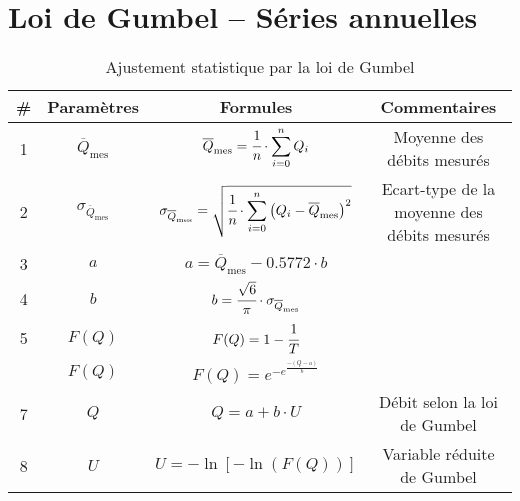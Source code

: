 \section{Loi de Gumbel -- Séries annuelles}
\begin{table}[H]
    \centering
    \begin{tabular}{c|c|c|c}
        \# & \textbf{Paramètres}                & \textbf{Formules}                                                                                                                         & \textbf{Commentaires}      \\
        \hline
        1  & $\overline{Q}_\text{mes}$          & $\overline{Q}_\text{mes} = \cfrac{1}{n} \cdot \displaystyle{\sum_{i=0}^{n} Q_i}$                                                          & Moyenne des débits mesurés \\
        \hline
        2  & $\sigma_{\overline{Q}_\text{mes}}$ & $\sigma_{\overline{Q}_\text{mes}} = \sqrt{\cfrac{1}{n} \cdot \displaystyle{\sum_{i=0}^{n} \left(Q_i - \overline{Q}_\text{mes}\right)^2}}$ & Ecart-type de la moyenne des débits mesurés \\
        \hline
        3  & $a$                                & $a = \overline{Q}_\text{mes} - 0.5772 \cdot b$                                                                                            & \\
        \hline
        4  & $b$                                & $b = \cfrac{\sqrt{6}}{\pi} \cdot \sigma_{\overline{Q}_\text{mes}}$                                                                        & \\
        \hline
        5  & $F(Q)$                             & $F(Q) = 1-\cfrac{1}{T}$                                                                                                                   & \\
        \hdashline                   
        6  & $F(Q)$                             & $F(Q) = e^{-e^{\frac{- \left(Q-a\right)}{b}}}$                                                                                            & \\
        \hline
        7  & $Q$                                & $Q = a + b \cdot U$                                                                                                                       & Débit selon la loi de Gumbel \\
        \hline
        8  & $U$                                & $U = -\ln \left[ -\ln \left(F(Q)\right)\right]$                                                                                          & Variable réduite de Gumbel   \\
    \end{tabular}
    \caption{Ajustement statistique par la loi de Gumbel}
    \label{tab:loiGumbel}
\end{table}

